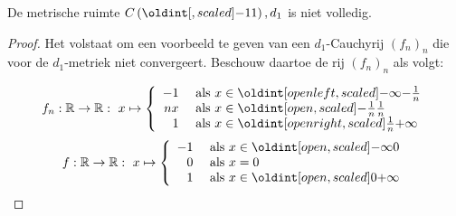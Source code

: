 \documentclass[main.tex]{subfiles}
\begin{document}
\begin{vb}
  De metrische ruimte $C\left( \interval{-1}{1} \right),d_{1}$ is niet volledig.

  \begin{proof}
    Het volstaat om een voorbeeld te geven van een $d_{1}$-Cauchyrij $(f_{n})_{n}$ die voor de $d_{1}$-metriek niet convergeert.
    Beschouw daartoe de rij $(f_{n})_{n}$ als volgt:

    \noindent
    \begin{minipage}{.45\textwidth}
      \begin{figure}[H]
        \centering
      \end{figure}
    \end{minipage}
    \begin{minipage}{.45\textwidth}
      \[
      f_{n}: \mathbb{R} \rightarrow \mathbb{R}:\ x \mapsto
      \left\{
        \begin{array}{rl}
          -1 & \text{ als } x \in \interval[open left ]{-\infty}{-\frac{1}{n}}\\
          nx & \text{ als } x \in \interval[open      ]{-\frac{1}{n}}{\frac{1}{n}}\\
          1  & \text{ als } x \in \interval[open right]{\frac{1}{n}}{+\infty}\\
        \end{array}
      \right.
      \]
      \[
      f: \mathbb{R} \rightarrow \mathbb{R}:\ x \mapsto
      \left\{
        \begin{array}{rl}
          -1 & \text{ als } x \in \interval[open]{-\infty}{0}\\
          0  & \text{ als } x = 0\\
          1  & \text{ als } x \in \interval[open]{0}{+\infty}\\
        \end{array}
      \right.
      \]
    \end{minipage}
    

\end{proof}
\end{vb}
\end{document}
